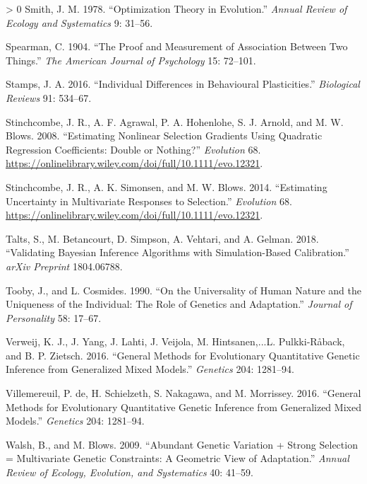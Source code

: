 \documentclass{article}
\newlength{\cslhangindent}
\newenvironment{CSLReferences}[3] %
 {%
  \setlength{\parindent}{0pt}
  \ifodd #1 \everypar{\setlength{\hangindent}{\cslhangindent}}\ignorespaces\fi
  \ifnum #2 > 0
  \setlength{\parskip}{#2\baselineskip}
  \fi
 }%
 {}
\begin{document}
\begin{CSLReferences}{1}{0}
\leavevmode\hypertarget{ref-Smith1978}{}%
Smith, J. M. 1978. {``Optimization Theory in Evolution.''} \emph{Annual
Review of Ecology and Systematics} 9: 31--56.

\leavevmode\hypertarget{ref-Spearman1904}{}%
Spearman, C. 1904. {``The Proof and Measurement of Association Between
Two Things.''} \emph{The American Journal of Psychology} 15: 72--101.

\leavevmode\hypertarget{ref-Stamps2016}{}%
Stamps, J. A. 2016. {``Individual Differences in Behavioural
Plasticities.''} \emph{Biological Reviews} 91: 534--67.

\leavevmode\hypertarget{ref-Stinch2008}{}%
Stinchcombe, J. R., A. F. Agrawal, P. A. Hohenlohe, S. J. Arnold, and M.
W. Blows. 2008. {``Estimating Nonlinear Selection Gradients Using
Quadratic Regression Coefficients: Double or Nothing?''}
\emph{Evolution} 68.
\url{https://onlinelibrary.wiley.com/doi/full/10.1111/evo.12321}.

\leavevmode\hypertarget{ref-Stinch2014}{}%
Stinchcombe, J. R., A. K. Simonsen, and M. W. Blows. 2014. {``Estimating
Uncertainty in Multivariate Responses to Selection.''} \emph{Evolution}
68. \url{https://onlinelibrary.wiley.com/doi/full/10.1111/evo.12321}.

\leavevmode\hypertarget{ref-Talts2018}{}%
Talts, S., M. Betancourt, D. Simpson, A. Vehtari, and A. Gelman. 2018.
{``Validating Bayesian Inference Algorithms with Simulation-Based
Calibration.''} \emph{arXiv Preprint} 1804.06788.

\leavevmode\hypertarget{ref-Tooby1990}{}%
Tooby, J., and L. Cosmides. 1990. {``On the Universality of Human Nature
and the Uniqueness of the Individual: The Role of Genetics and
Adaptation.''} \emph{Journal of Personality} 58: 17--67.

\leavevmode\hypertarget{ref-Verw2012}{}%
Verweij, K. J., J. Yang, J. Lahti, J. Veijola, M. Hintsanen,...L.
Pulkki‐Råback, and B. P. Zietsch. 2016. {``General Methods for
Evolutionary Quantitative Genetic Inference from Generalized Mixed
Models.''} \emph{Genetics} 204: 1281--94.

\leavevmode\hypertarget{ref-Vill2016}{}%
Villemereuil, P. de, H. Schielzeth, S. Nakagawa, and M. Morrissey. 2016.
{``General Methods for Evolutionary Quantitative Genetic Inference from
Generalized Mixed Models.''} \emph{Genetics} 204: 1281--94.

\leavevmode\hypertarget{ref-Walsh2009}{}%
Walsh, B., and M. Blows. 2009. {``Abundant Genetic Variation + Strong
Selection = Multivariate Genetic Constraints: A Geometric View of
Adaptation.''} \emph{Annual Review of Ecology, Evolution, and
Systematics} 40: 41--59.


\end{CSLReferences}
\end{document}
